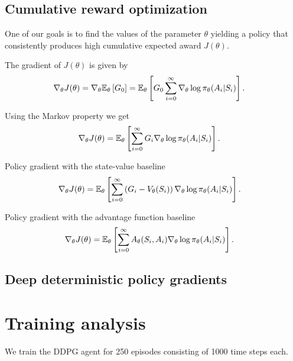 \documentclass[a4paper,12pt]{amsart}
\newcommand{\stateValueFunc}{V}
\newcommand{\advantageFunc}{A}
\newcommand{\policy}{\pi}
\begin{document}
\subsection{Cumulative reward optimization}
One of our goals is to find the values of the parameter $\theta$ yielding a
policy that consistently produces high cumulative expected award $J(\theta)$.

The gradient of $J(\theta)$ is given by
\begin{align*}
    \nabla_{\theta} J(\theta) &= 
    \nabla_{\theta} \E_{\theta} \left[ G_{0} \right] = 
    \E_{\theta} \left[ G_0 \sum_{i=0}^{\infty} 
    \nabla_{\theta}\log\policy_{\theta}(A_i | S_i) \right].
\end{align*}

Using the Markov property we get
\begin{align*}
    \nabla_{\theta} J(\theta) &= 
    \E_{\theta} \left[ \sum_{i=0}^{\infty} G_{i}
    \nabla_{\theta}\log\policy_{\theta}(A_i | S_i)  \right].
\end{align*}

Policy gradient with the state-value baseline
\begin{align*}
    \nabla_{\theta} J(\theta) &= 
    \E_{\theta} \left[ \sum_{i=0}^{\infty} \left( G_{i}-\stateValueFunc_{\theta}(S_i) \right)
    \nabla_{\theta}\log\policy_{\theta}(A_i | S_i) \right].
\end{align*}

Policy gradient with the advantage function baseline
\begin{align*}
    \nabla_{\theta} J(\theta) &= 
    \E_{\theta} \left[ \sum_{i=0}^{\infty} \advantageFunc_{\theta}(S_i, A_i)
    \nabla_{\theta}\log\policy_{\theta}(A_i | S_i) \right].
\end{align*}

\subsection{Deep deterministic policy gradients}












\section{Training analysis}

We train the DDPG agent for 250 episodes consisting of 1000 time steps each.
\end{document}
